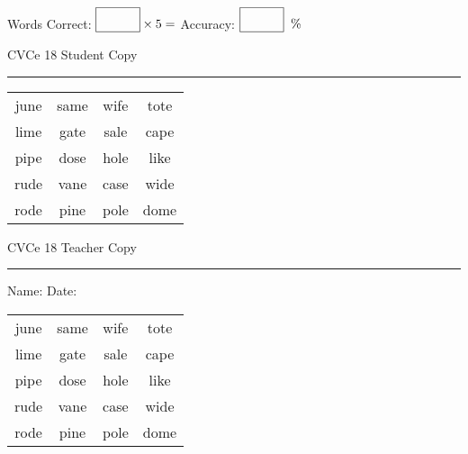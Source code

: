 \documentclass{memoir}
\begin{document}
\small

Words Correct: $\fbox{\phantom{\huge 100}} \times 5 = $ Accuracy: $\fbox{\phantom{\huge 100}}\;\; \%$ 

\vfill

\newpage


\footnotesize \noindent
CVCe 18 \hfill Student Copy
\smallskip
\hrule

\Large

\setlength{\tabcolsep}{14pt}
\def\arraystretch{2}

{\selectfont


\begin{vplace}[0.5]
\begin{center}
\begin{tabular}{cccc}
june & same & wife & tote \\
lime & gate & sale & cape \\
pipe & dose & hole & like \\
rude & vane & case & wide \\
rode & pine & pole & dome \\
\end{tabular}
\end{center}
\end{vplace}

}

\newpage

\footnotesize \noindent
CVCe 18 \hfill Teacher Copy
\smallskip
\hrule

\small

\vfill

\noindent
Name: \underline{\hspace{1.75in}} \hfill Date: \underline{\hspace{1in}}

\Large

{\selectfont


\begin{vplace}[0.5]
\begin{center}
\begin{tabular}{cccc}
june & same & wife & tote \\
lime & gate & sale & cape \\
pipe & dose & hole & like \\
rude & vane & case & wide \\
rode & pine & pole & dome \\
\end{tabular}
\end{center}
\end{vplace}



}
\end{document}
